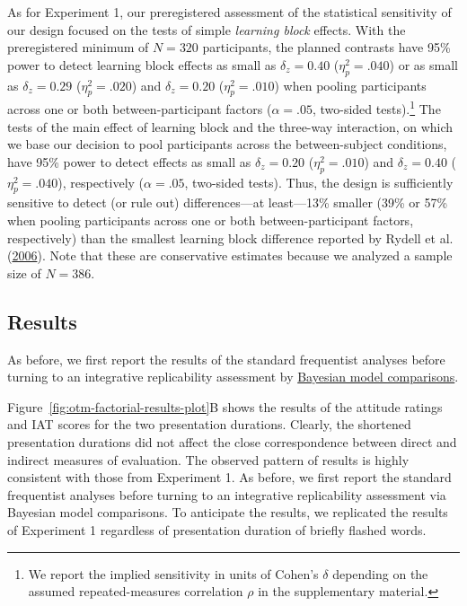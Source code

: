 \documentclass[
  man,floatsintext]{apa6}
\begin{document}
As for Experiment 1, our preregistered assessment of the statistical sensitivity of our design focused on the tests of simple \emph{learning block} effects.
With the preregistered minimum of \(N = 320\) participants, the planned contrasts have 95\% power to detect learning block effects as small as \(\delta_z = 0.40\) (\(\eta_p^2 = .040\)) or as small as \(\delta_z = 0.29\) (\(\eta_p^2 = .020\)) and \(\delta_z = 0.20\) (\(\eta_p^2 = .010\)) when pooling participants across one or both between-participant factors (\(\alpha = .05\), two-sided tests).\footnote{We report the implied sensitivity in units of Cohen's \(\delta\) depending on the assumed repeated-measures correlation \(\rho\) in the supplementary material.}
The tests of the main effect of learning block and the three-way interaction, on which we base our decision to pool participants across the between-subject conditions, have 95\% power to detect effects as small as \(\delta_z = 0.20\) (\(\eta_p^2 = .010\)) and
\(\delta_z = 0.40\) (\(\eta_p^2 = .040\)), respectively (\(\alpha = .05\), two-sided tests).
Thus, the design is sufficiently sensitive to detect (or rule out) differences---at least---13\% smaller (39\% or 57\% when pooling participants across one or both between-participant factors, respectively) than the smallest learning block difference reported by Rydell et al. (\protect\hyperlink{ref-rydell_two_2006}{2006}).
Note that these are conservative estimates because we analyzed a sample size of \(N = 386\).

\hypertarget{results-1}{%
\subsection{Results}\label{results-1}}

As before, we first report the results of the standard frequentist analyses before turning to an integrative replicability assessment by \protect\hyperlink{replicability-assessment2}{Bayesian model comparisons}.

Figure~\ref{fig:otm-factorial-results-plot}B shows the results of the attitude ratings and IAT scores for the two presentation durations.
Clearly, the shortened presentation durations did not affect the close correspondence between direct and indirect measures of evaluation.
The observed pattern of results is highly consistent with those from Experiment 1.
As before, we first report the standard frequentist analyses before turning to an integrative replicability assessment via Bayesian model comparisons.
To anticipate the results, we replicated the results of Experiment 1 regardless of presentation duration of briefly flashed words.
\end{document}
